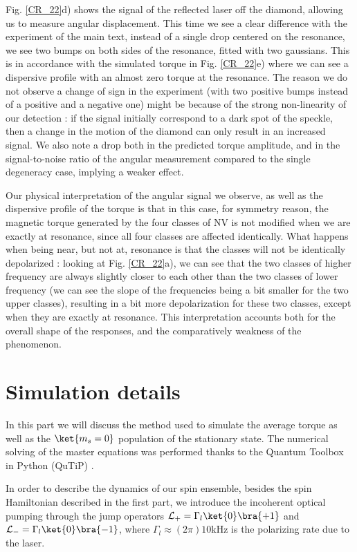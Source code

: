 \documentclass[preprintnumbers,amsmath,amssymb,onecolumn,12pt]{revtex4}
\begin{document}
Fig. \ref{CR_22}d) shows the signal of the reflected laser off the diamond, allowing us to measure angular displacement. This time we see a clear difference with the experiment of the main text, instead of a single drop centered on the resonance, we see two bumps on both sides of the resonance, fitted with two gaussians.
This is in accordance with the simulated torque in Fig. \ref{CR_22}e) where we can see a dispersive profile with an almost zero torque at the resonance. The reason we do not observe a change of sign in the experiment (with two positive bumps instead of a positive and a negative one) might be because of the strong non-linearity of our detection : if the signal initially correspond to a dark spot of the speckle, then a change in the motion of the diamond can only result in an increased signal. We also note a drop both in the predicted torque amplitude, and in the signal-to-noise ratio  of the angular measurement compared to the single degeneracy case, implying a weaker effect.

Our physical interpretation of the angular signal we observe, as well as the dispersive profile of the torque is that in this case, for symmetry reason, the magnetic torque generated by the four classes of NV is not modified when we are exactly at resonance, since all four classes are affected identically. What happens when being near, but not at, resonance is that the classes will not be identically depolarized : looking at Fig. \ref{CR_22}a), we can see that the two classes of higher frequency are always slightly closer to each other than the two classes of lower frequency (we can see the slope of the frequencies being a bit smaller for the two upper classes), resulting in a bit more depolarization for these two classes, except when they are exactly at resonance. This interpretation accounts both for the overall shape of the responses, and the comparatively weakness of the phenomenon.


\section{Simulation details}
In this part we will discuss the method used to simulate the average torque as well as the $\ket{m_s=0}$ population of the stationary state. The numerical solving of the master equations was performed thanks to the Quantum Toolbox in Python (QuTiP) \citep{qutip1} \citep{qutip2}.

In order to describe the dynamics of our spin ensemble, besides the spin Hamiltonian described in the first part, we introduce the incoherent optical pumping through the jump operators $\mathcal{L}_+ = \Gamma_l \ket{0}\bra{+1} $ and $\mathcal{L}_- = \Gamma_l \ket{0}\bra{-1} $, where $\Gamma_l \approx (2\pi) 10$kHz is the polarizing rate due to the laser.
\end{document}
